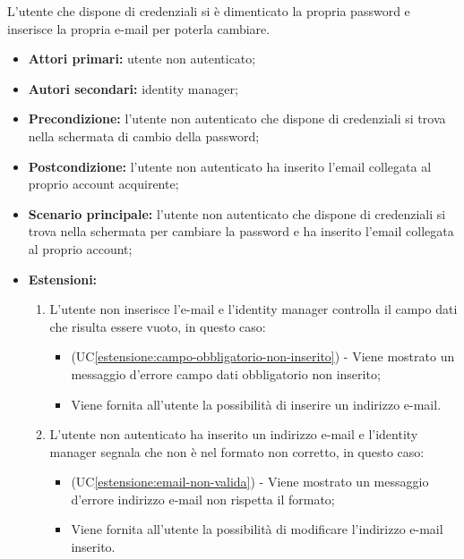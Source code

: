 L'utente che dispone di credenziali si è dimenticato la propria password e inserisce la propria e-mail per poterla cambiare.
\begin{itemize}
    \item \textbf{Attori primari:} utente non autenticato;
    \item \textbf{Autori secondari:} identity manager;
    \item \textbf{Precondizione:} l'utente non autenticato che dispone di credenziali si trova nella schermata di cambio della password;
    \item \textbf{Postcondizione:} l'utente non autenticato ha inserito l'email collegata al proprio account acquirente;
    \item \textbf{Scenario principale:} l'utente non autenticato che dispone di credenziali si trova nella schermata per cambiare la password e ha inserito l'email collegata al proprio account;
	\item \textbf{Estensioni:}
	\begin{enumerate}[label=\lett]
		\item L'utente non inserisce l'e-mail e l'identity manager controlla il campo dati che risulta essere vuoto, in questo caso:
		\begin{itemize}
			\item (UC\ref{estensione:campo-obbligatorio-non-inserito}) - Viene mostrato un messaggio d'errore campo dati obbligatorio non inserito;
			\item Viene fornita all'utente la possibilità di inserire un indirizzo e-mail.
		\end{itemize}
		\item L'utente non autenticato ha inserito un indirizzo e-mail e l'identity manager segnala che non è nel formato non corretto, in questo caso:
		\begin{itemize}
			\item (UC\ref{estensione:email-non-valida}) - Viene mostrato un messaggio d'errore indirizzo e-mail non rispetta il formato;
			\item Viene fornita all'utente la possibilità di modificare l'indirizzo e-mail inserito.
		\end{itemize}
	\end{enumerate}
\end{itemize}

\label{password-dimenticata.password}

